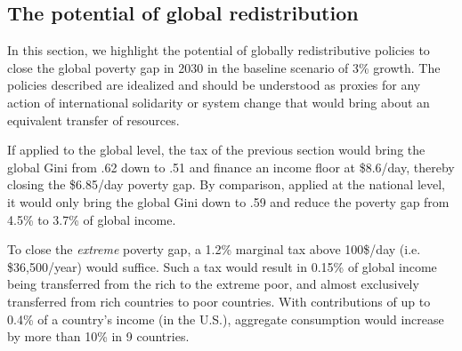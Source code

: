 \subsection{The potential of global redistribution\label{subsec:global}} %

In this section, we highlight the potential of globally redistributive policies to close the global poverty gap in 2030 in the baseline scenario of 3\% growth. The policies described are idealized and should be understood as proxies for any action of international solidarity or system change that would bring about an equivalent transfer of resources. %

If applied to the global level, the tax of the previous section would bring the global Gini from .62 down to .51 and finance an income floor at \$8.6/day, thereby closing the \$6.85/day poverty gap. By comparison, applied at the national level, it would only bring the global Gini down to .59 and reduce the poverty gap from 4.5\% to 3.7\% of global income. 

To close the \textit{extreme} poverty gap, a 1.2\% marginal tax %
above 100\$/day (i.e. \$36,500/year) would suffice. %
Such a tax would result in 0.15\% of global income being transferred from the rich to the extreme poor, and almost exclusively transferred from rich countries to poor countries. 
With contributions of up to 0.4\% of a country's income (in the U.S.), aggregate consumption would increase by more than 10\% in 9 countries. 

